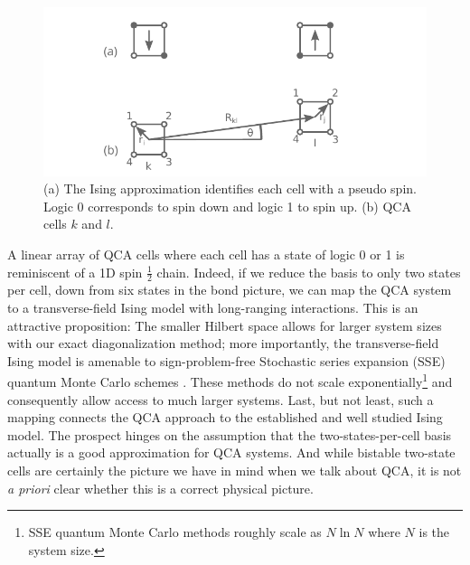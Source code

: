 %
\begin{figure}
  \center
  \includegraphics{ising}
  \caption{
  (a) The Ising approximation identifies each cell with a pseudo spin. Logic 0
  corresponds to spin down and logic 1 to spin up. (b) QCA cells $k$ and $l$. 
  }
  \label{fig:ising}
\end{figure}
%
A linear array of QCA cells where each cell has a state of logic 0 or 1 is
reminiscent of a 1D spin $\frac{1}{2}$ chain. Indeed, if we reduce the basis to
only two states per cell, down from six states in the bond picture, we
can map the QCA system to a transverse-field Ising model with long-ranging
interactions. This is an attractive proposition: The smaller Hilbert space
allows for larger system sizes with our exact diagonalization method; more
importantly, the transverse-field Ising model is amenable to sign-problem-free
Stochastic series expansion (SSE) quantum Monte Carlo schemes
\cite{Sandvik2003}. These methods do not scale exponentially\footnote{SSE
quantum Monte Carlo methods roughly scale as $N \ln N$ where $N$ is the system
size.} and consequently allow access to much larger systems. Last, but not
least, such a mapping connects the QCA approach to the established and well
studied Ising model. The prospect hinges on the assumption that the
two-states-per-cell basis actually is a good approximation for QCA systems. And
while bistable two-state cells are certainly the picture we have in mind when we
talk about QCA, it is not \emph{a priori} clear whether this is a correct
physical picture. 

